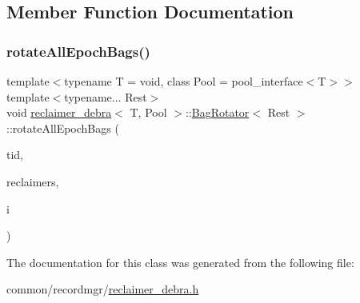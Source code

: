 \subsection{Member Function Documentation}
\mbox{\label{classreclaimer__debra_1_1BagRotator_afbddb968a51d703a13397031aa69bc42}} 
\subsubsection{\texorpdfstring{rotate\+All\+Epoch\+Bags()}{rotateAllEpochBags()}}
{\footnotesize\ttfamily template$<$typename T  = void, class Pool  = pool\+\_\+interface$<$\+T$>$$>$ \\
template$<$typename... Rest$>$ \\
void \hyperlink{classreclaimer__debra}{reclaimer\+\_\+debra}$<$ T, Pool $>$\+::\hyperlink{classreclaimer__debra_1_1BagRotator}{Bag\+Rotator}$<$ Rest $>$\+::rotate\+All\+Epoch\+Bags (\begin{DoxyParamCaption}\item[{const int}]{tid,  }\item[{void $\ast$const $\ast$const}]{reclaimers,  }\item[{const int}]{i }\end{DoxyParamCaption})\hspace{0.3cm}{\ttfamily [inline]}}



The documentation for this class was generated from the following file\+:\begin{DoxyCompactItemize}
\item 
common/recordmgr/\hyperlink{reclaimer__debra_8h}{reclaimer\+\_\+debra.\+h}\end{DoxyCompactItemize}
